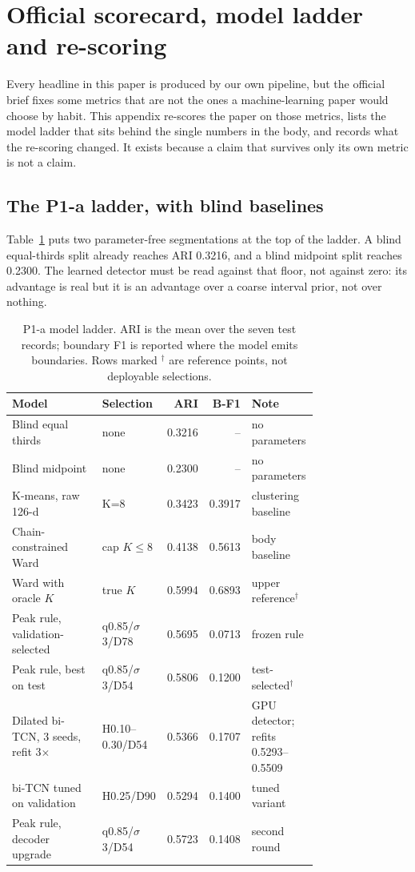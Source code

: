 \clearpage
\section{Official scorecard, model ladder and re-scoring}
\label{app:scorecard}
Every headline in this paper is produced by our own pipeline, but the official
brief fixes some metrics that are not the ones a machine-learning paper would
choose by habit. This appendix re-scores the paper on those metrics, lists the
model ladder that sits behind the single numbers in the body, and records what
the re-scoring changed. It exists because a claim that survives only its own
metric is not a claim.

\subsection*{The P1-a ladder, with blind baselines}
Table~\ref{tab:appL-p1a} puts two parameter-free segmentations at the top of the
ladder. A blind equal-thirds split already reaches ARI 0.3216, and a
blind midpoint split reaches 0.2300. The learned detector must be read
against that floor, not against zero: its advantage is real but it is an advantage
over a coarse interval prior, not over nothing.

\begin{table}[H]\centering\scriptsize
\caption{P1-a model ladder. ARI is the mean over the seven test records; boundary F1 is reported where the model emits boundaries. Rows marked $^\dagger$ are reference points, not deployable selections.}
\label{tab:appL-p1a}
\begin{tabular}{p{0.34\linewidth}p{0.20\linewidth}rrp{0.22\linewidth}}
\toprule
Model & Selection & ARI & B-F1 & Note \\
\midrule
Blind equal thirds & none & 0.3216 & -- & no parameters \\
Blind midpoint & none & 0.2300 & -- & no parameters \\
K-means, raw 126-d & K=8 & 0.3423 & 0.3917 & clustering baseline \\
Chain-constrained Ward & cap $K\leq8$ & 0.4138 & 0.5613 & body baseline \\
Ward with oracle $K$ & true $K$ & 0.5994 & 0.6893 & upper reference$^\dagger$ \\
Peak rule, validation-selected & q0.85/$\sigma$3/D78 & 0.5695 & 0.0713 & frozen rule \\
Peak rule, best on test & q0.85/$\sigma$3/D54 & 0.5806 & 0.1200 & test-selected$^\dagger$ \\
Dilated bi-TCN, 3 seeds, refit 3$\times$ & H0.10--0.30/D54 & 0.5366 & 0.1707 & GPU detector; refits 0.5293--0.5509 \\
bi-TCN tuned on validation & H0.25/D90 & 0.5294 & 0.1400 & tuned variant \\
Peak rule, decoder upgrade & q0.85/$\sigma$3/D54 & 0.5723 & 0.1408 & second round \\
\bottomrule\end{tabular}\end{table}

